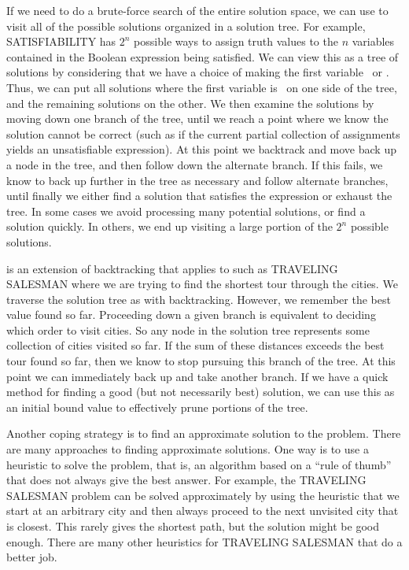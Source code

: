 If we need to do a brute-force search of the entire solution space, we
can use  to visit all of the possible solutions
organized in a solution tree.
For example, SATISFIABILITY has \(2^n\) possible ways to assign truth
values to the \(n\) variables contained in the Boolean expression being
satisfied.
We can view this as a tree of solutions by considering that we have a
choice of making the first variable \TRUE\ or \FALSE.
Thus, we can put all solutions where the first variable is \TRUE\ on
one side of the tree, and the remaining solutions on the other.
We then examine the solutions by moving down one branch of the tree,
until we reach a point where we know the solution cannot be correct
(such as if the current partial collection of assignments yields an
unsatisfiable expression).
At this point we backtrack and move back up a node in the tree, and
then follow down the alternate branch.
If this fails, we know to back up further in the tree as necessary and
follow alternate branches, until finally we either find a solution
that satisfies the expression or exhaust the
tree.
In some cases we avoid processing many potential solutions, or find a
solution quickly.
In others, we end up visiting a large portion of the \(2^n\) possible
solutions.

 is an extension of backtracking that applies
to  such as TRAVELING SALESMAN where we
are trying to find the shortest tour through the
cities.
We traverse the solution tree as with backtracking.
However, we remember the best value found so far.
Proceeding down a given branch is equivalent to deciding which order
to visit cities.
So any node in the solution tree represents some collection of cities
visited so far.
If the sum of these distances exceeds the best tour found so far, then
we know to stop pursuing this branch of the tree.
At this point we can immediately back up and take another branch.
If we have a quick method for finding a good (but not necessarily
best) solution, we can use this as an initial bound value to
effectively prune portions of the tree.

Another coping strategy is to find an approximate solution to the
problem.
There are many approaches to finding approximate solutions.
One way is to use a heuristic to solve the problem, that is, an
algorithm based on a ``rule of thumb'' that does not always give the
best answer.
For example, the TRAVELING SALESMAN problem can be solved
approximately by using the heuristic that we start at an arbitrary
city and then always proceed to the next unvisited city that is
closest.
This rarely gives the shortest path, but the solution might be good
enough.
There are many other heuristics for TRAVELING SALESMAN that do a
better job.

